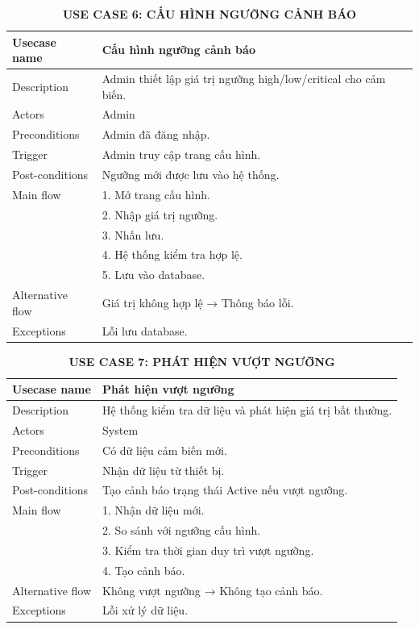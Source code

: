 \begin{table}[H]
\centering
\caption*{\textbf{USE CASE 6: CẤU HÌNH NGƯỠNG CẢNH BÁO}}
\renewcommand{\arraystretch}{1.3}
\begin{tabular}{|p{4cm}|p{11cm}|}
\hline
Usecase name & Cấu hình ngưỡng cảnh báo \\
\hline
Description & Admin thiết lập giá trị ngưỡng high/low/critical cho cảm biến. \\
\hline
Actors & Admin \\
\hline
Preconditions & Admin đã đăng nhập. \\
\hline
Trigger & Admin truy cập trang cấu hình. \\
\hline
Post-conditions & Ngưỡng mới được lưu vào hệ thống. \\
\hline
Main flow &
1. Mở trang cấu hình.\\ & 
2. Nhập giá trị ngưỡng.\\ &
3. Nhấn lưu.\\ &
4. Hệ thống kiểm tra hợp lệ.\\ &
5. Lưu vào database. \\
\hline
Alternative flow & Giá trị không hợp lệ → Thông báo lỗi. \\
\hline
Exceptions & Lỗi lưu database. \\
\hline
\end{tabular}
\end{table}
\begin{table}[H]
\centering
\caption*{\textbf{USE CASE 7: PHÁT HIỆN VƯỢT NGƯỠNG}}
\renewcommand{\arraystretch}{1.3}
\begin{tabular}{|p{4cm}|p{11cm}|}
\hline
Usecase name & Phát hiện vượt ngưỡng \\
\hline
Description & Hệ thống kiểm tra dữ liệu và phát hiện giá trị bất thường. \\
\hline
Actors & System \\
\hline
Preconditions & Có dữ liệu cảm biến mới. \\
\hline
Trigger & Nhận dữ liệu từ thiết bị. \\
\hline
Post-conditions & Tạo cảnh báo trạng thái Active nếu vượt ngưỡng. \\
\hline
Main flow &
1. Nhận dữ liệu mới.\\ &
2. So sánh với ngưỡng cấu hình.\\ &
3. Kiểm tra thời gian duy trì vượt ngưỡng.\\ &
4. Tạo cảnh báo. \\
\hline
Alternative flow & Không vượt ngưỡng → Không tạo cảnh báo. \\
\hline
Exceptions & Lỗi xử lý dữ liệu. \\
\hline
\end{tabular}
\end{table}
